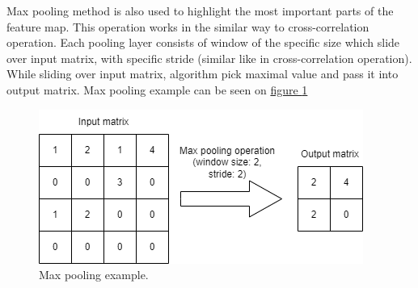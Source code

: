     Max pooling method is also used to highlight the most important parts of the feature map. This operation works in the similar way to cross-correlation operation. Each pooling layer consists of window of the specific size which slide over input matrix, with specific stride (similar like in cross-correlation operation). While sliding over input matrix, algorithm pick maximal value and pass it into output matrix. Max pooling example can be seen on \hyperref[fig:max-pooling-example]{figure \ref*{fig:max-pooling-example}}
    \begin{figure}
        \centering
        \includegraphics[width=\textwidth]{dependencies/pictures/Max_Pooling_example.png}
        \caption{Max pooling example.}
        \label{fig:max-pooling-example}
    \end{figure}

